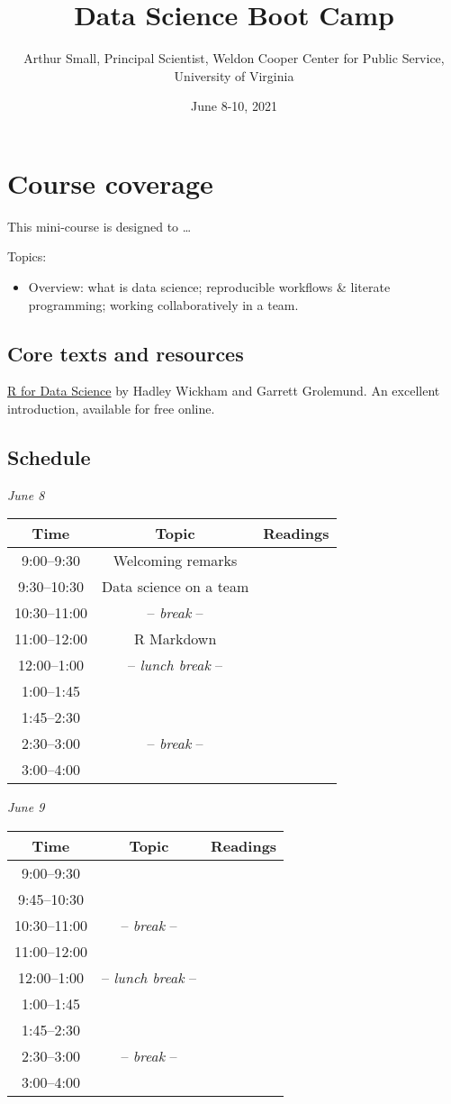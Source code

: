 \documentclass[
]{book}
\title{Data Science Boot Camp}
\author{Arthur Small, Principal Scientist,
Weldon Cooper Center for Public Service, University of Virginia}
\date{June 8-10, 2021}
\providecommand{\tightlist}{%
  \setlength{\itemsep}{0pt}\setlength{\parskip}{0pt}}
\begin{document}
\maketitle

{
\setcounter{tocdepth}{1}
\tableofcontents
}
\hypertarget{course-coverage}{%
\chapter*{Course coverage}\label{course-coverage}}

This mini-course is designed to \ldots{}

Topics:

\begin{itemize}
\tightlist
\item
  Overview: what is data science; reproducible workflows \& literate programming; working collaboratively in a team.
\end{itemize}

\hypertarget{core-texts-and-resources}{%
\section{Core texts and resources}\label{core-texts-and-resources}}

\href{https://r4ds.had.co.nz/}{R for Data Science} by Hadley Wickham and Garrett Grolemund. An excellent introduction, available for free online.

\hypertarget{schedule}{%
\section*{Schedule}\label{schedule}}

\emph{June 8}

\begin{longtable}[]{@{}ccl@{}}
\toprule
Time & Topic & Readings\tabularnewline
\midrule
\endhead
9:00--9:30 & Welcoming remarks &\tabularnewline
9:30--10:30 & Data science on a team &\tabularnewline
10:30--11:00 & -- \emph{break} -- &\tabularnewline
11:00--12:00 & R Markdown &\tabularnewline
12:00--1:00 & -- \emph{lunch break} -- &\tabularnewline
1:00--1:45 & &\tabularnewline
1:45--2:30 & &\tabularnewline
2:30--3:00 & -- \emph{break} -- &\tabularnewline
3:00--4:00 & &\tabularnewline
\bottomrule
\end{longtable}

\emph{June 9}

\begin{longtable}[]{@{}ccl@{}}
\toprule
Time & Topic & Readings\tabularnewline
\midrule
\endhead
9:00--9:30 & &\tabularnewline
9:45--10:30 & &\tabularnewline
10:30--11:00 & -- \emph{break} -- &\tabularnewline
11:00--12:00 & &\tabularnewline
12:00--1:00 & -- \emph{lunch break} -- &\tabularnewline
1:00--1:45 & &\tabularnewline
1:45--2:30 & &\tabularnewline
2:30--3:00 & -- \emph{break} -- &\tabularnewline
3:00--4:00 & &\tabularnewline
\bottomrule
\end{longtable}
\end{document}
